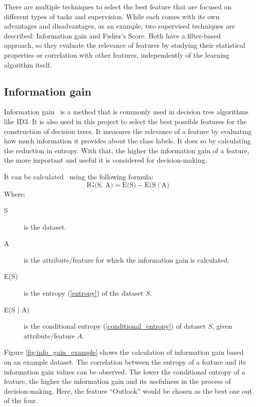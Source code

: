 There are multiple techniques to select the best feature that are focused on different types of tasks and supervision. While each comes with its own advantages and disadvantages, as an example, two supervised techniques are described: Information gain and Fisher's Score. Both have a filter-based approach, so they evaluate the relevance of features by studying their statistical properties or correlation with other features, independently of the learning algorithm itself.

\subsection{Information gain} \label{information_gain}
Information gain~\cite{feature_selection} is a method that is commonly used in decision tree algorithms like ID3. It is also used in this project to select the best possible features for the construction of decision trees. It measures the relevance of a feature by evaluating how much information it provides about the class labels. It does so by calculating the reduction in entropy. With that, the higher the information gain of a feature, the more important and useful it is considered for decision-making.

It can be calculated~\cite{information_gain_wiki} using the following formula:
\[ \text{IG(S, A)} = \text{E(S)} - \text{E(S}\mid \text{A)}\]
Where:
\begin{description}
	\item[S] is the dataset.
	\item[A] is the attribute/feature for which the information gain is calculated.
    \item[E(S)] is the entropy (\ref{entropy}) of the dataset $S$.
    \item[E(S $\mid$ A)] is the conditional entropy (\ref{conditional_entropy}) of dataset $S$, given attribute/feature $A$.
\end{description}

Figure \ref{fig:info_gain_example} shows the calculation of information gain based on an example dataset.
The correlation between the entropy of a feature and its information gain values can be observed. The lower the conditional entropy of a feature, the higher the information gain and its usefulness in the process of decision-making. Here, the feature ``Outlook'' would be chosen as the best one out of the four.

